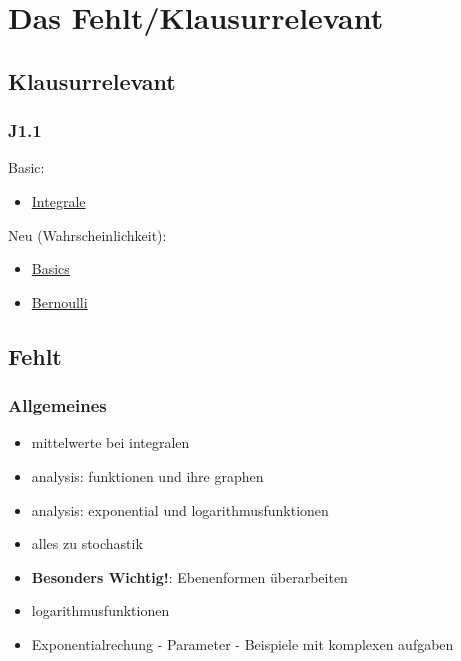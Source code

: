 \chapter{Das Fehlt/Klausurrelevant}

\section{Klausurrelevant}
\subsection{J1.1}
Basic:
\begin{itemize}
    \item \hyperref[sec:integrale]{Integrale} 
\end{itemize}

Neu (Wahrscheinlichkeit):
\begin{itemize}
    \item \hyperref[sec:elemkombinatorik]{Basics}
    \item \hyperref[sec:bernoulli]{Bernoulli}
\end{itemize}

\section{Fehlt}
\subsection{Allgemeines}
\begin{itemize}
    \item mittelwerte bei integralen
    \item analysis: funktionen und ihre graphen
    \item analysis: exponential und logarithmusfunktionen
    \item alles zu stochastik
    \item \textbf{Besonders Wichtig!}: Ebenenformen überarbeiten 
    \item logarithmusfunktionen
    \item Exponentialrechung - Parameter - Beispiele mit komplexen aufgaben
\end{itemize}

